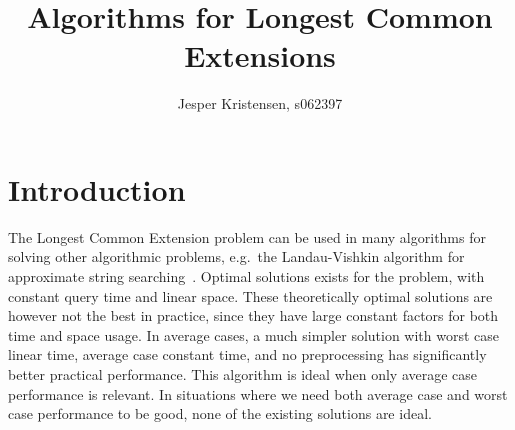 \documentclass[a4]{article}
\title{Algorithms for Longest Common Extensions}
\author{Jesper Kristensen, s062397}
\begin{document}
\newif\ifarticle
\newif\ifreport

\reporttrue

\maketitle

\newcommand{\sortt}{\textit{sort}(n,\sigma)}
\newcommand{\LCE}{\textit{LCE}}
\newcommand{\NCA}{\textit{NCA}}
\newcommand{\RMQ}{\textit{RMQ}}
\newcommand{\SA}{\textit{SA}}
\newcommand{\SAinv}{\textit{SA}^{-1}} %
\newcommand{\SAi}{SA$^{-1}$} %
\newcommand{\LCP}{\textit{LCP}}
\newcommand{\LA}{\textit{LA}}
\newcommand{\suff}{\textit{suff}}
\newcommand{\logceil}{\lceil\log n\rceil}
\newcommand{\fprint}[1][k]{\ensuremath{\proc{Fingerprint}_{#1}}}
\newcommand{\fprintk}{\fprint[k]}
\newcommand{\RMQpq}[2]{RMQ\textless$#1$, $#2$\textgreater}
\newcommand{\RMQn}{\RMQpq{1}{n}}
\newcommand{\RMQq}{\RMQpq{n}{1}}
\newcommand{\RMQlog}{\RMQpq{n}{\log n}}


\tableofcontents

\vspace{1cm}

\newpage

\section{Introduction\label{sec:intro}}

The Longest Common Extension problem can be used in many algorithms for solving other algorithmic problems, e.g.\ the Landau-Vishkin algorithm for approximate string searching~\cite{approx-search}. Optimal solutions exists for the problem, with constant query time and linear space. These theoretically optimal solutions are however not the best in practice, since they have large constant factors for both time and space usage. In average cases, a much simpler solution with worst case linear time, average case constant time, and no preprocessing has significantly better practical performance. This algorithm is ideal when only average case performance is relevant. In situations where we need both average case and worst case performance to be good, none of the existing solutions are ideal.
\end{document}
